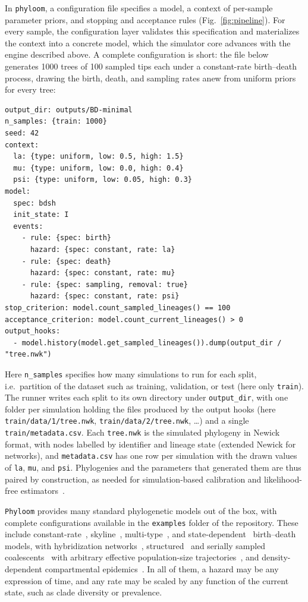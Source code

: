 \documentclass[11pt]{article}
\begin{document}
In \texttt{phyloom}, a configuration file specifies a model, a context of
per-sample parameter priors, and stopping and acceptance rules (Fig.~\ref{fig:pipeline}). For every
sample, the configuration layer validates this specification and materializes
the context into a concrete model, which the simulator core advances with the
engine described above. A
complete configuration is short: the file below generates 1000 trees of 100
sampled tips each under a constant-rate birth--death process, drawing the
birth, death, and sampling rates anew from uniform priors for every tree:
\begin{lstlisting}[style=cfg]
output_dir: outputs/BD-minimal
n_samples: {train: 1000}
seed: 42
context:
  la: {type: uniform, low: 0.5, high: 1.5}
  mu: {type: uniform, low: 0.0, high: 0.4}
  psi: {type: uniform, low: 0.05, high: 0.3}
model:
  spec: bdsh
  init_state: I
  events:
    - rule: {spec: birth}
      hazard: {spec: constant, rate: la}
    - rule: {spec: death}
      hazard: {spec: constant, rate: mu}
    - rule: {spec: sampling, removal: true}
      hazard: {spec: constant, rate: psi}
stop_criterion: model.count_sampled_lineages() == 100
acceptance_criterion: model.count_current_lineages() > 0
output_hooks:
  - model.history(model.get_sampled_lineages()).dump(output_dir / "tree.nwk")
\end{lstlisting}

Here \texttt{n\_samples} specifies how many simulations to run for each split,
i.e.\ partition of the dataset such as training, validation, or test (here only
\texttt{train}). The runner writes each split to its own directory under
\texttt{output\_dir}, with one folder per simulation holding the files produced
by the output hooks (here \texttt{train/data/1/tree.nwk},
\texttt{train/data/2/tree.nwk}, \ldots) and a single
\texttt{train/metadata.csv}. Each \texttt{tree.nwk} is the simulated phylogeny in Newick format,
with nodes labelled by identifier and lineage state (extended Newick for
networks), and \texttt{metadata.csv} has one row per simulation with the drawn
values of \texttt{la}, \texttt{mu}, and \texttt{psi}. Phylogenies and the
parameters that generated them are thus paired by construction, as needed for
simulation-based calibration and likelihood-free
estimators~\citep{voznica2022phylodeep}.


\texttt{Phyloom} provides many standard phylogenetic models out of the box, with complete configurations available in the \texttt{examples} folder of the repository. These include
constant-rate~\citep{stadler2010sampling}, skyline~\citep{stadler2013bdsky},
multi-type~\citep{kuhnert2016bdmm}, and
state-dependent~\citep{maddison2007bisse} birth--death models, with hybridization
networks~\citep{justison2023siphynetwork}, structured~\citep{notohara1990coalescent} and
serially sampled~\citep{drummond2002serial}
coalescents~\citep{kingman1982coalescent} with arbitrary effective
population-size trajectories~\citep{griffiths1994varying}, and
density-dependent compartmental epidemics~\citep{kermack1927contribution}. In all of them, a hazard may be
any expression of time, and any rate may be scaled
by any function of the current state, such as clade diversity or prevalence.
\end{document}
